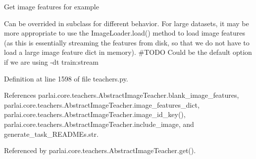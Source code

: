 \begin{DoxyVerb}Get image features for example

Can be overrided in subclass for different behavior.
For large datasets, it may be more appropriate to use the
ImageLoader.load() method to load image features (as this is essentially
streaming the features from disk, so that we do not have to load a
large image feature dict in memory).
#TODO Could be the default option if we are using -dt train:stream
\end{DoxyVerb}
 

Definition at line 1598 of file teachers.\+py.



References parlai.\+core.\+teachers.\+Abstract\+Image\+Teacher.\+blank\+\_\+image\+\_\+features, parlai.\+core.\+teachers.\+Abstract\+Image\+Teacher.\+image\+\_\+features\+\_\+dict, parlai.\+core.\+teachers.\+Abstract\+Image\+Teacher.\+image\+\_\+id\+\_\+key(), parlai.\+core.\+teachers.\+Abstract\+Image\+Teacher.\+include\+\_\+image, and generate\+\_\+task\+\_\+\+R\+E\+A\+D\+M\+Es.\+str.



Referenced by parlai.\+core.\+teachers.\+Abstract\+Image\+Teacher.\+get().

